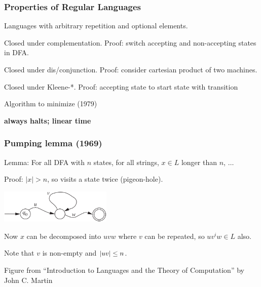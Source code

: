 \documentclass[languages_and_machines.tex]{subfiles}
\begin{document}
\begin{frame}
  \frametitle{Properties of Regular Languages}

  Languages with arbitrary repetition and optional elements.

  \pause

  Closed under complementation. \pause Proof: switch accepting and non-accepting states in DFA.

  \pause

  Closed under dis/conjunction. \pause Proof: consider cartesian product of two machines.

  \pause

  Closed under Kleene-*. \pause Proof: accepting state to start state with \emptystr transition

  \pause

  Algorithm to minimize (1979)

  \textbf{always halts; linear time}

\end{frame}

\begin{frame}
  \frametitle{Pumping lemma (1969)}

  Lemma: For all DFA with \(n\) states, for all strings, \(x \in L\) longer than \(n\), \(\ldots\)

  \pause

  Proof: \(\lvert x \rvert > n\), so visits a state twice (pigeon-hole).

  \includegraphics[width=0.4\textwidth]{pumping_lemma.png}

  \pause

  Now \(x\) can be decomposed into \(uvw\) where \(v\) can be repeated, so \(uv^iw \in L\) also.

Note that \(v\) is non-empty and \(\lvert uv\rvert \leq n\).

    {\tiny Figure from ``Introduction to Languages and the Theory of Computation'' by John C. Martin}

\end{frame}
\end{document}
